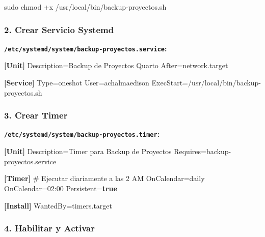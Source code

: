 \documentclass[
  doc,
  floatsintext,
  longtable,
  a4paper,
  nolmodern,
  notxfonts,
  notimes,
  12pt,
  colorlinks=true,linkcolor=blue,citecolor=blue,urlcolor=blue]{apa7}
\newenvironment{Shaded}{\begin{snugshade}}{\end{snugshade}}
\newcommand{\CommentTok}[1]{\textcolor[rgb]{0.37,0.37,0.37}{#1}}
\newcommand{\DataTypeTok}[1]{\textcolor[rgb]{0.68,0.00,0.00}{#1}}
\newcommand{\FunctionTok}[1]{\textcolor[rgb]{0.28,0.35,0.67}{#1}}
\newcommand{\KeywordTok}[1]{\textcolor[rgb]{0.00,0.23,0.31}{\textbf{#1}}}
\newcommand{\NormalTok}[1]{\textcolor[rgb]{0.00,0.23,0.31}{#1}}
\newcommand{\OtherTok}[1]{\textcolor[rgb]{0.00,0.23,0.31}{#1}}
\newcommand{\StringTok}[1]{\textcolor[rgb]{0.13,0.47,0.30}{#1}}
\begin{document}
\begin{Shaded}
\begin{Highlighting}[]
\FunctionTok{sudo}\NormalTok{ chmod +x /usr/local/bin/backup{-}proyectos.sh}
\end{Highlighting}
\end{Shaded}

\subsubsection{2. Crear Servicio Systemd}\label{crear-servicio-systemd}

\textbf{\texttt{/etc/systemd/system/backup-proyectos.service}:}

\begin{Shaded}
\begin{Highlighting}[]
\KeywordTok{[Unit]}
\DataTypeTok{Description}\OtherTok{=}\StringTok{Backup de Proyectos Quarto}
\DataTypeTok{After}\OtherTok{=}\StringTok{network.target}

\KeywordTok{[Service]}
\DataTypeTok{Type}\OtherTok{=}\StringTok{oneshot}
\DataTypeTok{User}\OtherTok{=}\StringTok{achalmaedison}
\DataTypeTok{ExecStart}\OtherTok{=}\StringTok{/usr/local/bin/backup{-}proyectos.sh}
\end{Highlighting}
\end{Shaded}

\subsubsection{3. Crear Timer}\label{crear-timer}

\textbf{\texttt{/etc/systemd/system/backup-proyectos.timer}:}

\begin{Shaded}
\begin{Highlighting}[]
\KeywordTok{[Unit]}
\DataTypeTok{Description}\OtherTok{=}\StringTok{Timer para Backup de Proyectos}
\DataTypeTok{Requires}\OtherTok{=}\StringTok{backup{-}proyectos.service}

\KeywordTok{[Timer]}
\CommentTok{\# Ejecutar diariamente a las 2 AM}
\DataTypeTok{OnCalendar}\OtherTok{=}\StringTok{daily}
\DataTypeTok{OnCalendar}\OtherTok{=}\StringTok{02:00}
\DataTypeTok{Persistent}\OtherTok{=}\KeywordTok{true}

\KeywordTok{[Install]}
\DataTypeTok{WantedBy}\OtherTok{=}\StringTok{timers.target}
\end{Highlighting}
\end{Shaded}

\subsubsection{4. Habilitar y Activar}\label{habilitar-y-activar}
\end{document}
